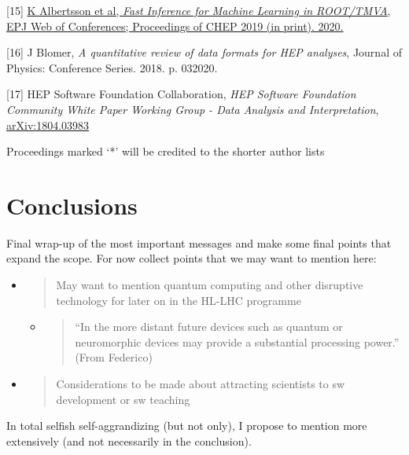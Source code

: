 \documentclass[11pt,a4paper]{article}
\begin{document}
{[}15{]} \href{http://paperpile.com/b/2mqsuS/6uIv}{K Albertsson et al,
\emph{Fast Inference for Machine Learning in ROOT/TMVA}, EPJ Web of
Conferences; Proceedings of CHEP 2019 (in print). 2020.}

{[}16{]} J Blomer, \emph{A quantitative review of data formats for HEP
analyses}, Journal of Physics: Conference Series. 2018. p. 032020.

{[}17{]} HEP Software Foundation Collaboration, \emph{HEP Software
Foundation Community White Paper Working Group - Data Analysis and
Interpretation},
\href{https://arxiv.org/abs/1804.03983}{{arXiv:1804.03983}}

Proceedings marked `*' will be credited to the shorter author lists

\hypertarget{conclusions}{%
\section{Conclusions}\label{conclusions}}

Final wrap-up of the most important messages and make some final points
that expand the scope. For now collect points that we may want to
mention here:

\begin{itemize}
\item
  \begin{quote}
  May want to mention quantum computing and other disruptive technology
  for later on in the HL-LHC programme
  \end{quote}

  \begin{itemize}
  \item
    \begin{quote}
    ``In the more distant future devices such as quantum or neuromorphic
    devices may provide a substantial processing power.'' (From
    Federico)
    \end{quote}
  \end{itemize}
\item
  \begin{quote}
  Considerations to be made about attracting scientists to sw
  development or sw teaching
  \end{quote}
\end{itemize}

In total selfish self-aggrandizing (but not only), I propose to mention
more extensively (and not necessarily in the conclusion).
\end{document}
